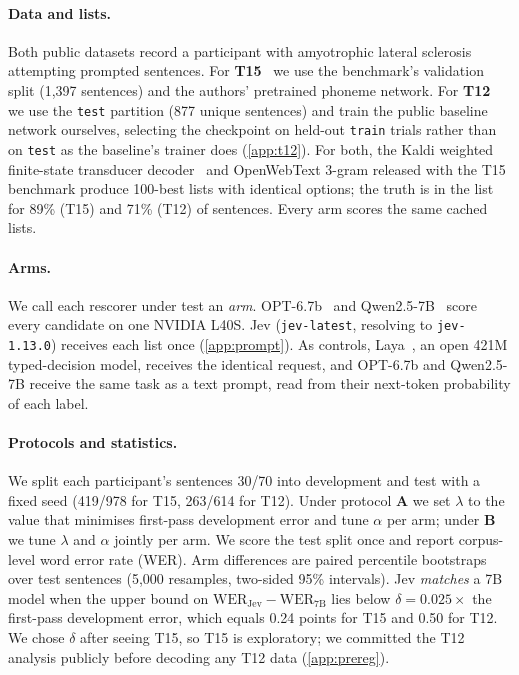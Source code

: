 \documentclass[11pt]{article}
\begin{document}
\paragraph{Data and lists.} Both public datasets record a participant with amyotrophic lateral
sclerosis attempting prompted sentences. For \textbf{T15}~\citep{card2024,t15data} we use the
benchmark's validation split (1,397 sentences) and the authors' pretrained phoneme network. For
\textbf{T12}~\citep{willett2023,t12data} we use the \texttt{test} partition (877 unique sentences) and
train the public baseline network ourselves, selecting the checkpoint on held-out \texttt{train}
trials rather than on \texttt{test} as the baseline's trainer does (\cref{app:t12}). For both, the
Kaldi weighted finite-state transducer decoder~\citep{povey2011kaldi} and OpenWebText 3-gram released with the T15 benchmark
produce 100-best lists with identical options; the truth is in the list for 89\% (T15) and 71\%
(T12) of sentences. Every arm scores the same cached lists.

\paragraph{Arms.} We call each rescorer under test an \emph{arm}. OPT-6.7b~\citep{zhang2022opt} and Qwen2.5-7B~\citep{qwen2025} score every
candidate on one NVIDIA L40S. Jev (\texttt{jev-latest}, resolving to \texttt{jev-1.13.0}) receives
each list once (\cref{app:prompt}). As controls, Laya~\citep{laya2026}, an open 421M typed-decision
model, receives the identical request, and OPT-6.7b and Qwen2.5-7B receive the same task as a text
prompt, read from their next-token probability of each label.

\paragraph{Protocols and statistics.} We split each participant's sentences 30/70 into development
and test with a fixed seed (419/978 for T15, 263/614 for T12). Under protocol \textbf{A} we set
$\lambda$ to the value that minimises first-pass development error and tune $\alpha$ per arm; under
\textbf{B} we tune $\lambda$ and $\alpha$ jointly per arm. We score the test split once and report
corpus-level word error rate (WER). Arm differences are paired percentile bootstraps over test
sentences (5,000 resamples, two-sided 95\% intervals). Jev \emph{matches} a 7B model when the upper
bound on $\mathrm{WER}_{\text{Jev}} - \mathrm{WER}_{\text{7B}}$ lies below
$\delta = 0.025 \times$ the first-pass development error, which equals 0.24 points for T15 and 0.50
for T12. We chose $\delta$ after seeing T15, so T15 is exploratory; we committed the T12 analysis publicly
before decoding any T12 data (\cref{app:prereg}).
\end{document}
